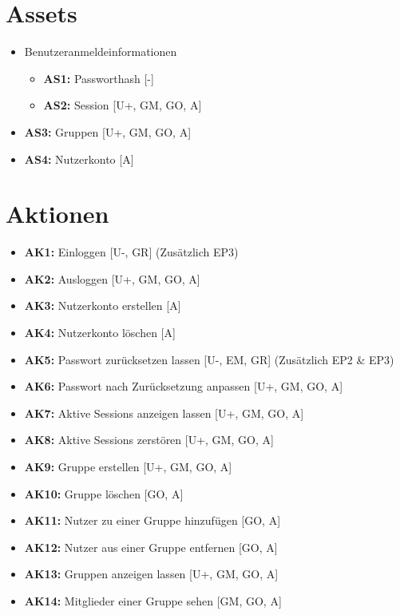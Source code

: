 \documentclass[fontsize=12pt,DIV=14,BCOR=10mm,a4paper,parskip=half-,ngerman,english,bibliography=totocnumbered]{scrreprt}
\begin{document}
\chapter{Assets}

\begin{itemize}
  \item Benutzeranmeldeinformationen
  \begin{itemize}
    \item \textbf{AS1:} Passworthash [-]
    \item \textbf{AS2:} Session [U+, GM, GO, A]
  \end{itemize}
  \item \textbf{AS3:} Gruppen [U+, GM, GO, A]
  \item \textbf{AS4:} Nutzerkonto [A]
\end{itemize}

\chapter{Aktionen}

\begin{itemize}
  \item \textbf{AK1:} Einloggen [U-, GR] (Zusätzlich EP3)
  \item \textbf{AK2:} Ausloggen [U+, GM, GO, A]
  \item \textbf{AK3:} Nutzerkonto erstellen [A]
  \item \textbf{AK4:} Nutzerkonto löschen [A]
  \item \textbf{AK5:} Passwort zurücksetzen lassen [U-, EM, GR] (Zusätzlich EP2 \& EP3)
  \item \textbf{AK6:} Passwort nach Zurücksetzung anpassen [U+, GM, GO, A]
  \item \textbf{AK7:} Aktive Sessions anzeigen lassen [U+, GM, GO, A]
  \item \textbf{AK8:} Aktive Sessions zerstören [U+, GM, GO, A]
  \item \textbf{AK9:} Gruppe erstellen [U+, GM, GO, A]
  \item \textbf{AK10:} Gruppe löschen [GO, A]
  \item \textbf{AK11:} Nutzer zu einer Gruppe hinzufügen [GO, A]
  \item \textbf{AK12:} Nutzer aus einer Gruppe entfernen [GO, A]
  \item \textbf{AK13:} Gruppen anzeigen lassen [U+, GM, GO, A]
  \item \textbf{AK14:} Mitglieder einer Gruppe sehen [GM, GO, A]
\end{itemize}
\end{document}
